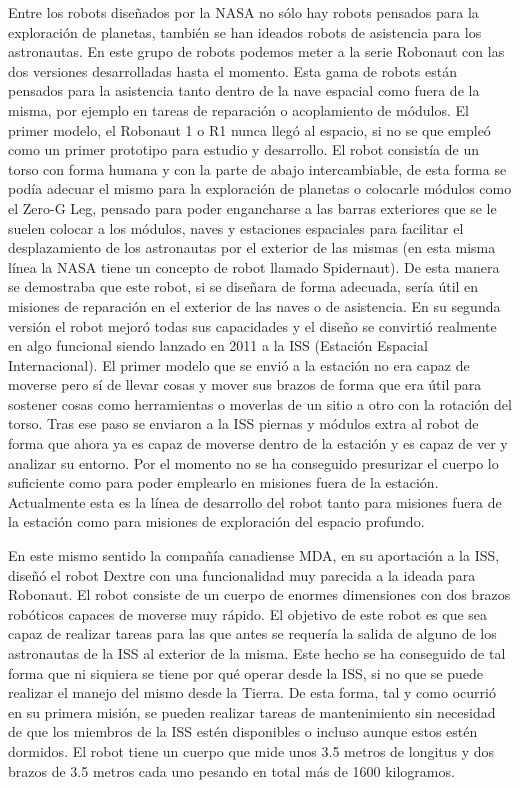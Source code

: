 Entre los robots diseñados por la NASA no sólo hay robots pensados para la exploración de planetas, también se han ideados robots de asistencia para los astronautas. En este grupo de robots podemos meter a la serie Robonaut con las dos versiones desarrolladas hasta el momento. Esta gama de robots están pensados para la asistencia tanto dentro de la nave espacial como fuera de la misma, por ejemplo en tareas de reparación o acoplamiento de módulos. El primer modelo, el Robonaut 1 o R1 nunca llegó al espacio, si no se que empleó como un primer prototipo para estudio y desarrollo. El robot consistía de un torso con forma humana y con la parte de abajo intercambiable, de esta forma se podía adecuar el mismo para la exploración de planetas o colocarle módulos como el Zero-G Leg, pensado para poder engancharse a las barras exteriores que se le suelen colocar a los módulos, naves y estaciones espaciales para facilitar el desplazamiento de los astronautas por el exterior de las mismas (en esta misma línea la NASA tiene un concepto de robot llamado Spidernaut). De esta manera se demostraba que este robot, si se diseñara de forma adecuada, sería útil en misiones de reparación en el exterior de las naves o de asistencia. En su segunda versión el robot mejoró todas sus capacidades y el diseño se convirtió realmente en algo funcional siendo lanzado en 2011 a la ISS (Estación Espacial Internacional). El primer modelo que se envió a la estación no era capaz de moverse pero sí de llevar cosas y mover sus brazos de forma que era útil para sostener cosas como herramientas o moverlas de un sitio a otro con la rotación del torso. Tras ese paso se enviaron a la ISS piernas y módulos extra al robot de forma que ahora ya es capaz de moverse dentro de la estación y es capaz de ver y analizar su entorno. Por el momento no se ha conseguido presurizar el cuerpo lo suficiente como para poder emplearlo en misiones fuera de la estación. Actualmente esta es la línea de desarrollo del robot tanto para misiones fuera de la estación como para misiones de exploración del espacio profundo.

En este mismo sentido la compañía canadiense MDA, en su aportación a la ISS, diseñó el robot Dextre con una funcionalidad muy parecida a la ideada para Robonaut. El robot consiste de un cuerpo de enormes dimensiones con dos brazos robóticos capaces de moverse muy rápido. El objetivo de este robot es que sea capaz de realizar tareas para las que antes se requería la salida de alguno de los astronautas de la ISS al exterior de la misma. Este hecho se ha conseguido de tal forma que ni siquiera se tiene por qué operar desde la ISS, si no que se puede realizar el manejo del mismo desde la Tierra. De esta forma, tal y como ocurrió en su primera misión, se pueden realizar tareas de mantenimiento sin necesidad de que los miembros de la ISS estén disponibles o incluso aunque estos estén dormidos. El robot tiene un cuerpo que mide unos 3.5 metros de longitus y dos brazos de 3.5 metros cada uno pesando en total más de 1600 kilogramos.


